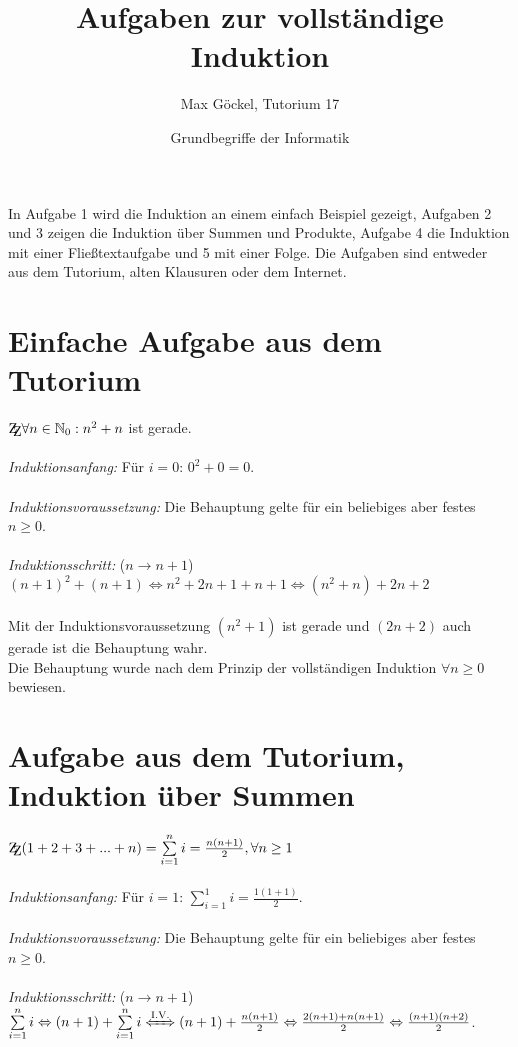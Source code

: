 \documentclass[11pt]{article} %
\title{Aufgaben zur vollständige Induktion}
\author{Max Göckel, Tutorium 17}
\date{Grundbegriffe der Informatik}
\newcommand{\zz}{\mathrm{Z\kern-.3em\raise-0.5ex\hbox{Z}}} %
\begin{document}
\maketitle
In Aufgabe 1 wird die Induktion an einem einfach Beispiel gezeigt, Aufgaben 2 und 3 zeigen die Induktion über Summen und Produkte, Aufgabe 4 die Induktion mit einer Fließtextaufgabe und 5 mit einer Folge. Die Aufgaben sind entweder aus dem Tutorium, alten Klausuren oder dem Internet.



\section{Einfache Aufgabe aus dem Tutorium}
$\zz \forall n \in \mathbb{N}_0: n^2 + n$ ist gerade.\\
\ \\
\emph{Induktionsanfang:} Für $i=0$: $0^2+0 = 0$.\\
\ \\
\emph{Induktionsvoraussetzung:} Die Behauptung gelte für ein beliebiges aber festes $n \geq 0$.\\
\ \\
\emph{Induktionsschritt:} ($n \rightarrow n+1$)\\
$(n+1)^2 + (n+1) \Leftrightarrow n^2 +2n+1+n+1 \Leftrightarrow (n^2 +n) + 2n +2$\\
\ \\
Mit der Induktionsvoraussetzung $(n^2 + 1)$ ist gerade und $(2n + 2)$ auch gerade ist die Behauptung wahr.\\

Die Behauptung wurde nach dem Prinzip der vollständigen Induktion $\forall n \geq 0$ bewiesen.
\ \\



\section{Aufgabe aus dem Tutorium, Induktion über Summen}
$\zz (1+2+3+...+n)= \sum \limits_{i=1}^n i = \frac{n(n+1)}{2}, \forall n \geq 1$\\
\ \\
\emph{Induktionsanfang:} Für $i=1$: $\sum \limits_{i=1}^1 i = \frac{1(1+1)}{2}$.\\
\ \\
\emph{Induktionsvoraussetzung:} Die Behauptung gelte für ein beliebiges aber festes $n \geq 0$.\\
\ \\
\emph{Induktionsschritt:} ($n \rightarrow n+1$)\\
$\sum \limits_{i=1}^n i \Leftrightarrow (n+1) + \sum \limits_{i=1}^n i \xLeftrightarrow{\text{I.V.}} (n+1) + \frac{n(n+1)}{2} \Leftrightarrow \frac{2(n+1) + n(n+1)}{2} \Leftrightarrow \frac{(n+1)(n+2)}{2}$.\\
\end{document}
